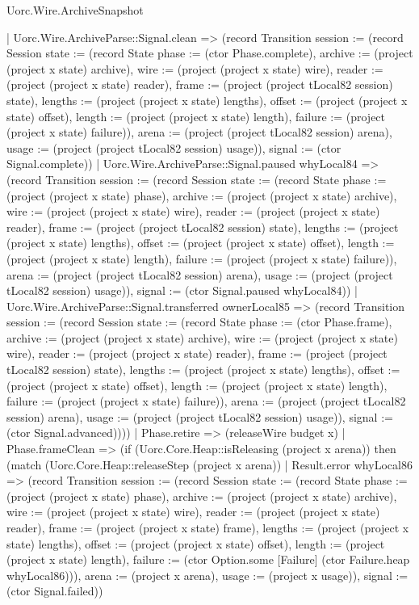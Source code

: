 \begin{lexlean}{Uorc.Wire.ArchiveSnapshot}
\begin{semanticmodule}
{        | Uorc.Wire.ArchiveParse::Signal.clean => (record Transition {session := (record Session {state := (record State {phase := (ctor Phase.complete), archive := (project (project x state) archive), wire := (project (project x state) wire), reader := (project (project x state) reader), frame := (project (project tLocal82 session) state), lengths := (project (project x state) lengths), offset := (project (project x state) offset), length := (project (project x state) length), failure := (project (project x state) failure)}), arena := (project (project tLocal82 session) arena), usage := (project (project tLocal82 session) usage)}), signal := (ctor Signal.complete)})
        | Uorc.Wire.ArchiveParse::Signal.paused whyLocal84 => (record Transition {session := (record Session {state := (record State {phase := (project (project x state) phase), archive := (project (project x state) archive), wire := (project (project x state) wire), reader := (project (project x state) reader), frame := (project (project tLocal82 session) state), lengths := (project (project x state) lengths), offset := (project (project x state) offset), length := (project (project x state) length), failure := (project (project x state) failure)}), arena := (project (project tLocal82 session) arena), usage := (project (project tLocal82 session) usage)}), signal := (ctor Signal.paused whyLocal84)})
        | Uorc.Wire.ArchiveParse::Signal.transferred ownerLocal85 => (record Transition {session := (record Session {state := (record State {phase := (ctor Phase.frame), archive := (project (project x state) archive), wire := (project (project x state) wire), reader := (project (project x state) reader), frame := (project (project tLocal82 session) state), lengths := (project (project x state) lengths), offset := (project (project x state) offset), length := (project (project x state) length), failure := (project (project x state) failure)}), arena := (project (project tLocal82 session) arena), usage := (project (project tLocal82 session) usage)}), signal := (ctor Signal.advanced)})))
      | Phase.retire => (releaseWire budget x)
      | Phase.frameClean => (if (Uorc.Core.Heap::isReleasing (project x arena)) then (match (Uorc.Core.Heap::releaseStep (project x arena))
        | Result.error whyLocal86 => (record Transition {session := (record Session {state := (record State {phase := (project (project x state) phase), archive := (project (project x state) archive), wire := (project (project x state) wire), reader := (project (project x state) reader), frame := (project (project x state) frame), lengths := (project (project x state) lengths), offset := (project (project x state) offset), length := (project (project x state) length), failure := (ctor Option.some [Failure] (ctor Failure.heap whyLocal86))}), arena := (project x arena), usage := (project x usage)}), signal := (ctor Signal.failed)})
}
\end{semanticmodule}
\end{lexlean}
